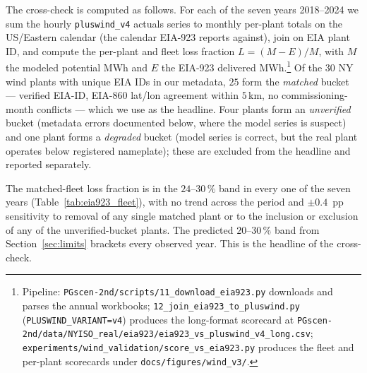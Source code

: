 \documentclass[11pt]{article}
\newcommand{\code}[1]{\texttt{\small #1}}
\begin{document}
The cross-check is computed as follows. For each of the seven years
2018--2024 we sum the
hourly \code{pluswind\_v4} actuals series to monthly per-plant totals
on the US/Eastern calendar (the calendar EIA-923 reports against), join
on EIA plant ID, and compute the per-plant and fleet loss fraction
$L = (M-E)/M$, with $M$ the modeled potential MWh and $E$ the
EIA-923 delivered MWh.\footnote{Pipeline:
\code{PGscen-2nd/scripts/11\_download\_eia923.py} downloads and parses
the annual workbooks; \code{12\_join\_eia923\_to\_pluswind.py}
(\code{PLUSWIND\_VARIANT=v4}) produces the long-format scorecard at
\code{PGscen-2nd/data/NYISO\_real/eia923/eia923\_vs\_pluswind\_v4\_long.csv};
\code{experiments/wind\_validation/score\_vs\_eia923.py} produces the
fleet and per-plant scorecards under \code{docs/figures/wind\_v3/}.}
Of the $30$ NY wind plants with unique EIA IDs in our metadata, $25$
form the \emph{matched} bucket --- verified EIA-ID, EIA-860 lat/lon
agreement within $5\,$km, no commissioning-month conflicts --- which we
use as the headline. Four plants form an \emph{unverified} bucket
(metadata errors documented below, where the model series is suspect)
and one plant forms a \emph{degraded} bucket (model series is correct,
but the real plant operates below registered nameplate); these are
excluded from the headline and reported separately.

The matched-fleet loss fraction is in the
$24$--$30\,\%$ band in every one of the seven years
(Table~\ref{tab:eia923_fleet}), with no trend across the period and
$\pm 0.4$~pp sensitivity to removal of any single matched plant or to
the inclusion or exclusion of any of the unverified-bucket plants. The
predicted $20$--$30\,\%$ band from Section~\ref{sec:limits} brackets
every observed year. This is the headline of the cross-check.
\end{document}
